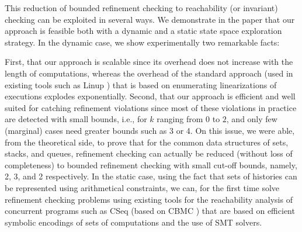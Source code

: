This reduction of bounded refinement checking to reachability (or invariant) checking can be exploited in several ways. We demonstrate in the paper that our approach is feasible both with a dynamic and a static state space exploration strategy. In the dynamic case, we show experimentally two remarkable facts: 

First, that our approach is scalable since its overhead does not increase with the length of computations, whereas the overhead of the standard approach (used in existing tools such as Linup \cite{}) that is based on enumerating linearizations of executions explodes exponentially. 
%
Second, that our approach is efficient and well suited for catching refinement violations since most of these violations in practice are detected with small bounds, i.e., for $k$ ranging from 0 to $2$, and only few (marginal) cases need greater bounds such as 3 or 4. On this issue, we were able, from the theoretical side, to prove that for the common data structures of sets, stacks, and queues, refinement checking can actually be reduced (without loss of completeness) to bounded refinement checking with small cut-off bounds, namely, 2, 3, and 2 respectively. 
In the static case, using the fact that sets of histories can be represented using arithmetical constraints, we can, for the first time solve refinement checking problems using existing tools for the reachability analysis of concurrent programs such as CSeq \cite{} (based on CBMC \cite{}) that are based on efficient symbolic encodings of sets of computations and the use of SMT solvers. %






%


